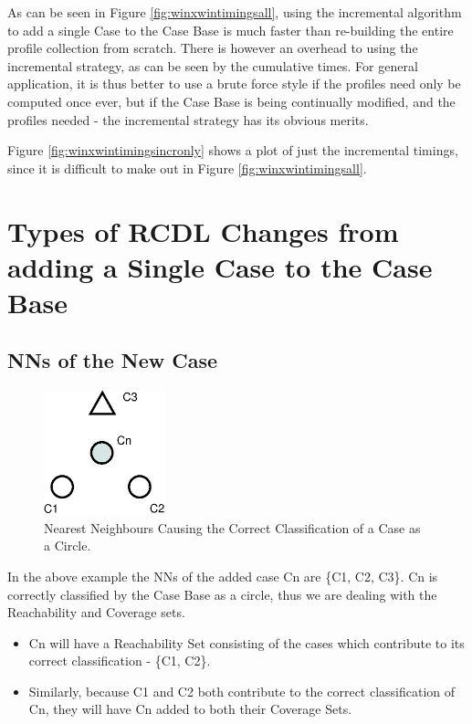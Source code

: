 \documentclass[a4paper,11pt]{report}
\begin{document}
\begin{samepage}
As can be seen in Figure \ref{fig:winxwintimingsall}, using the incremental algorithm to add a single Case to the Case Base is much faster than re-building the entire profile collection from scratch. There is however an overhead to using the incremental strategy, as can be seen by the cumulative times. For general application, it is thus better to use a brute force style if the profiles need only be computed once ever, but if the Case Base is being continually modified, and the profiles needed - the incremental strategy has its obvious merits.

Figure \ref{fig:winxwintimingsincronly} shows a plot of just the incremental timings, since it is difficult to make out in Figure \ref{fig:winxwintimingsall}.
\end{samepage}


\section{Types of RCDL Changes from adding a Single Case to the Case Base}
\subsection{NNs of the New Case}
\begin{figure}[h!] 
\centering
	\includegraphics[width=100pt]{./Drawn/NNsCorrectlyClassify}
\caption{Nearest Neighbours Causing the Correct Classification of a Case as a Circle.}
\label{fig:NNsCorrect}
\end{figure}

In the above example the NNs of the added case Cn are \{C1, C2, C3\}. Cn is correctly classified by the Case Base as a circle, thus we are dealing with the Reachability and Coverage sets.
\begin{itemize}
	\item Cn will have a Reachability Set consisting of the cases which contribute to its correct classification - \{C1, C2\}.
	\item Similarly, because C1 and C2 both contribute to the correct classification of Cn, they will have Cn added to both their Coverage Sets.
\end{itemize}
\end{document}
